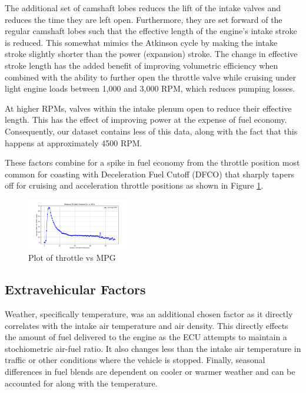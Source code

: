 \documentclass[letterpaper]{article}
\begin{document}
The additional set of camshaft lobes reduces the lift of the intake valves 
and reduces the time they are left open. Furthermore, they are set forward 
of the regular camshaft lobes such that the effective length of the 
engine's intake stroke is reduced. This somewhat mimics the Atkinson cycle 
by making the intake stroke slightly shorter than the power (expansion) 
stroke. The change in effective stroke length has the added benefit of 
improving volumetric efficiency when combined with the ability to further 
open the throttle valve while cruising under light engine loads between 
1,000 and 3,000 RPM, which reduces pumping losses.

At higher RPMs, valves within the intake plenum open to reduce their 
effective length. This has the effect of improving power at the expense 
of fuel economy. Consequently, our dataset contains less of this data, 
along with the fact that this happens at approximately 4500 RPM.

These factors combine for a spike in fuel economy from the throttle 
position most common for coasting with Deceleration Fuel Cutoff (DFCO) 
that sharply tapers off for cruising and acceleration throttle positions 
as shown in Figure \ref{fig:throttlevsmpg}. 

\begin{figure}[htbp]
    \centering
    \includegraphics[width=0.4\textwidth]{figures/throttle_vs_mpg.png}
    \caption{Plot of throttle vs MPG}
    \label{fig:throttlevsmpg}
\end{figure}

\subsection*{Extravehicular Factors}

Weather, specifically temperature, was an additional chosen factor as it 
directly correlates with the intake air temperature and air density. 
This directly effects the amount of fuel delivered to the engine as the
ECU attempts to maintain a stochiometric air-fuel ratio. It 
also changes less than the intake air temperature in traffic or other 
conditions where the vehicle is stopped. Finally, seasonal differences in 
fuel blends are dependent on cooler or warmer weather and can be accounted 
for along with the temperature.
\end{document}
